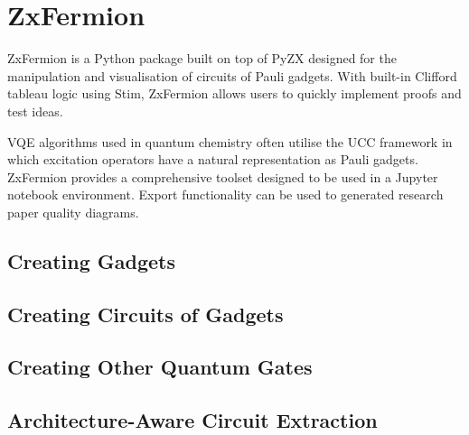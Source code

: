 \chapter{\label{ch:3-variational-quantum-algorithms}ZxFermion}

ZxFermion is a Python package built on top of PyZX designed for the manipulation and visualisation of circuits of Pauli gadgets. With built-in Clifford tableau logic using Stim, ZxFermion allows users to quickly implement proofs and test ideas.

VQE algorithms used in quantum chemistry often utilise the UCC framework in which excitation operators have a natural representation as Pauli gadgets. ZxFermion provides a comprehensive toolset designed to be used in a Jupyter notebook environment. Export functionality can be used to generated research paper quality diagrams.

\section{Creating Gadgets}
\section{Creating Circuits of Gadgets}
\section{Creating Other Quantum Gates}
\section{Architecture-Aware Circuit Extraction}

